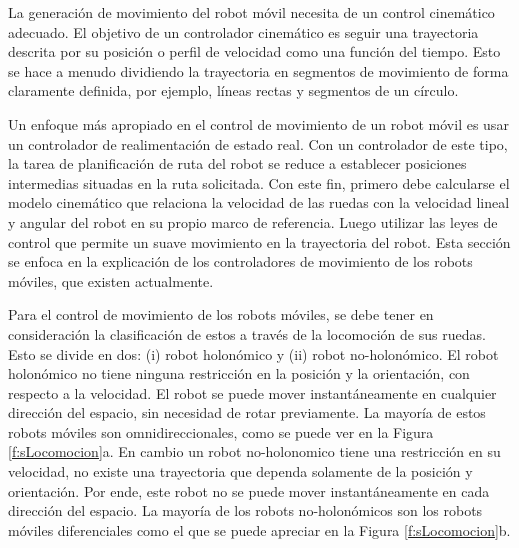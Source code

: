 La generación de movimiento del robot móvil necesita de un control cinemático 
adecuado. El objetivo de un controlador cinemático es seguir una trayectoria descrita 
por su posición o perfil de velocidad como una función del tiempo. Esto se hace 
a menudo dividiendo la trayectoria en segmentos de movimiento de forma claramente 
definida, por ejemplo, líneas rectas y segmentos de un círculo.

Un enfoque más apropiado en el control de movimiento de un robot móvil es usar 
un controlador de realimentación de estado real. Con un controlador de este tipo, 
la tarea de planificación de ruta del robot se reduce a establecer posiciones 
intermedias situadas en la ruta solicitada. Con este fin, primero debe calcularse 
el modelo cinemático que relaciona la velocidad de las ruedas con la velocidad 
lineal y angular del robot en su propio marco de referencia. Luego utilizar las 
leyes de control que permite un suave movimiento en la trayectoria del robot. Esta
sección se enfoca en la explicación de los controladores de movimiento de 
los robots móviles, que existen actualmente.

Para el control de movimiento de los robots móviles, se debe tener en consideración 
la clasificación de estos a través de la locomoción de sus ruedas. Esto se divide 
en dos: (i) robot holonómico y (ii) robot no-holonómico. El robot holonómico 
no tiene ninguna restricción en la posición y la orientación, con respecto a la 
velocidad. El robot se puede mover instantáneamente en cualquier dirección 
del espacio, sin necesidad de rotar previamente. La mayoría de estos robots 
móviles son omnidireccionales, como se puede ver en la Figura 
\ref{f:sLocomocion}a. En cambio un robot no-holonomico tiene una restricción 
en su velocidad, no existe una trayectoria que dependa solamente de la posición y 
orientación. Por ende, este robot no se puede mover instantáneamente en cada 
dirección del espacio. La mayoría de los robots no-holonómicos son los robots 
móviles diferenciales como el que se puede apreciar en la Figura \ref{f:sLocomocion}b.

